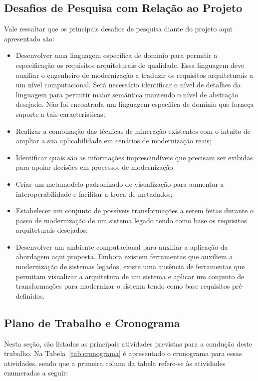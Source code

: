 \documentclass[12pt]{article}
\begin{document}
\subsection{Desafios de Pesquisa com Relação ao Projeto}

Vale ressaltar que os principais desafios de pesquisa diante do projeto aqui apresentado são:

\begin{itemize}
\item Desenvolver uma linguagem específica de domínio para permitir a especificação os requisitos arquiteturais de qualidade. Essa linguagem deve auxiliar o engenheiro de modernização a traduzir os requisitos arquiteturais a um nível computacional. Será necessário identificar o nível de detalhes da linguagem para permitir maior semântica mantendo o nível de abstração desejado. Não foi encontrada um linguagem específica de domínio que forneça suporte a tais características;
\item Realizar a combinação das técnicas de mineração existentes com o intuito de ampliar a sua aplicabilidade em cenários de modernização reais;
\item Identificar quais são as informações imprescindíveis que precisam ser exibidas para apoiar decisões em processos de modernização;
\item Criar um metamodelo padronizado de visualização para aumentar a interoperabilidade e facilitar a troca de metadados;
\item Estabelecer um conjunto de possíveis transformações a serem feitas durante o passo de modernização de um sistema legado tendo como base os requisitos arquiteturais desejados;
\item Desenvolver um ambiente computacional para auxiliar a aplicação da abordagem aqui proposta. Embora existem ferramentas que auxiliem a modernização de sistemas legados, existe uma ausência de ferramentas que permitam visualizar a arquitetura de um sistema e aplicar um conjunto de transformações para modernizar o sistema tendo como base requisitos pré-definidos.

\end{itemize}

\subsection{Plano de Trabalho e Cronograma}

Nesta seção, são listadas as principais atividades previstas para a condução deste trabalho. Na Tabela~\ref{tab:cronograma} é apresentado o cronograma para essas atividades, sendo que a primeira coluna da tabela refere-se às atividades enumeradas a seguir:
\end{document}
